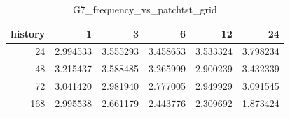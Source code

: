 \begin{table}
\caption{G7_frequency_vs_patchtst_grid}
\label{tab:G7_frequency_vs_patchtst_grid}
\begin{tabular}{rrrrrr}
\toprule
history & 1 & 3 & 6 & 12 & 24 \\
\midrule
24 & 2.994533 & 3.555293 & 3.458653 & 3.533324 & 3.798234 \\
48 & 3.215437 & 3.588485 & 3.265999 & 2.900239 & 3.432339 \\
72 & 3.041420 & 2.981940 & 2.777005 & 2.949929 & 3.091545 \\
168 & 2.995538 & 2.661179 & 2.443776 & 2.309692 & 1.873424 \\
\bottomrule
\end{tabular}
\end{table}
